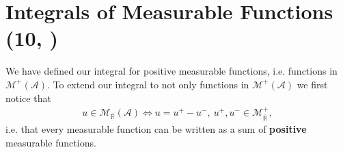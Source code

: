 \section{Integrals of Measurable Functions \protect\\ \tiny{(10, \cite{schilling2017measures})}}
We have defined our integral for positive measurable functions, i.e. functions in \(\mathcal{M}^{+}(\mathscr{A})\). To extend our integral
to not only functions in \(\mathcal{M}^{+}(\mathscr{A})\) we first notice that
\begin{align*}
    u \in \mathcal{M}_{\overline{\mathbb{R}}}(\mathscr{A}) \Leftrightarrow 
    u = u^+ - u^-, \ u^+, u^-\in \mathcal{M}^{+}_{\overline{\mathbb{R}}},
\end{align*}
i.e. that every measurable function can be written as a sum of \textbf{positive} measurable functions.

